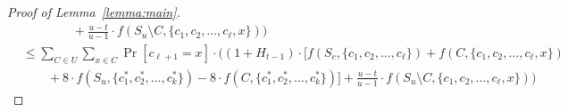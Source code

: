 \documentclass[9pt]{article}
\begin{document}
\begin{proof}[Proof of Lemma~\ref{lemma:main}]
\begin{align*}
& \qquad \qquad + \frac{u-t}{u-1} \cdot f(S_u \setminus C, \{c_1, c_2, \dots, c_\ell, x \} ) \bigg) \\
& \le \sum_{C \in U} \sum_{x \in C} \Pr[c_{\ell+1} = x] \cdot \bigg( (1+H_{t-1}) \cdot [f(S_c, \{c_1, c_2, \dots, c_{\ell}\}) + f(C, \{c_1, c_2, \dots, c_\ell, x\}) \\
& \qquad  + 8 \cdot f(S_u, \{c^*_1, c^*_2, \dots, c^*_k\}) - 8 \cdot f(C, \{c^*_1, c^*_2, \dots, c^*_k\})] + \frac{u-t}{u-1} \cdot f(S_u \setminus C, \{c_1, c_2, \dots, c_\ell, x \} ) \bigg)
\end{align*}

\end{proof}
\end{document}
